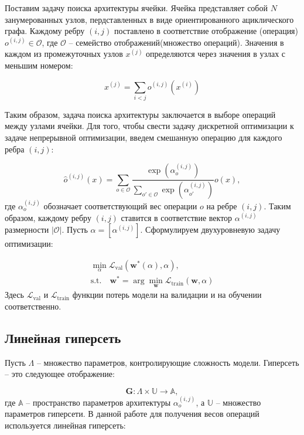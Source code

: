 \documentclass[12pt, twoside]{article}
\begin{document}
Поставим задачу поиска архитектуры ячейки.
 Ячейка представляет собой $N$ занумерованных узлов, пердставленных в виде ориентированного ациклического графа. Каждому ребру $(i, j)$ поставлено в соответствие  отображение (операция) $o^{(i, j)} \in \mathcal{O}$, где $\mathcal{O}$ -- семейство отображений(множество операций). Значения в каждом из промежуточных узлов $x^{(j)}$ определяются через значения в узлах с меньшим номером:
 
 \begin{equation}
 x^{(j)} = \sum_{i < j}o^{(i, j)}(x^{(i)})
 \end{equation}
 
 Таким образом, задача поиска архитектуры заключается в выборе операций между узлами ячейки. Для того, чтобы свести задачу дискретной оптимизации к задаче непрерывной оптимизации, введем смешанную операцию для каждого ребра $(i, j)$:

\begin{equation}
\hat{o}^{(i, j)}(x) = \sum_{o\in \mathcal{O}} \frac{\exp(\alpha_o^{(i, j)})}{\sum_{o'\in\mathcal{O}} \exp(\alpha_{o'}^{(i, j)})}o(x),
\end{equation}
где $\alpha_o^{(i, j)}$ обозначает соответствующий вес операции $o$ на ребре $(i, j)$. Таким образом, каждому ребру $(i, j)$ ставится в соответствие вектор $\alpha^{(i, j)}$ размерности $|\mathcal{O}|$. Пусть $\alpha = [\alpha^{(i, j)}]$. Сформулируем двухуровневую задачу оптимизации:

\begin{equation}
\label{optim}
\begin{aligned}
\min_{\alpha}\mathcal{L}_\text{val}(\mathbf{w}^*(\alpha), \alpha),\\
 \mathrm{s.t.}\quad \mathbf{w}^* = \arg\min_{\mathbf{w}}\mathcal{L}_\text{train}(\mathbf{w}, \alpha)
 \end{aligned}
\end{equation}
Здесь $\mathcal{L}_\text{val}$ и $\mathcal{L}_\text{train}$ функции потерь модели на валидации и на обучении соответственно.

\subsection{Линейная гиперсеть}

Пусть $\Lambda$ --  множество параметров, контролирующие сложность модели. Гиперсеть -- это следующее отображение:

\begin{equation}
	\mathbf{G} : \Lambda \times \mathbb{U} \rightarrow \mathbb{A},
\end{equation}
где $\mathbb{A}$ -- пространство параметров архитектуры $\alpha^{(i, j)}_o$, а $\mathbb{U}$ -- множество параметров гиперсети.
В данной работе для получения весов операций используется линейная гиперсеть:
 
\end{document}
